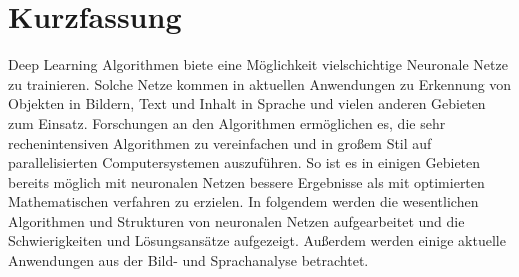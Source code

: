 \chapter{Kurzfassung}

Deep Learning Algorithmen biete eine Möglichkeit vielschichtige Neuronale Netze zu trainieren. Solche Netze kommen in aktuellen Anwendungen zu Erkennung von Objekten in Bildern, Text und Inhalt in Sprache und vielen anderen Gebieten zum Einsatz. Forschungen an den Algorithmen ermöglichen es, die sehr rechenintensiven Algorithmen zu vereinfachen und in großem Stil auf parallelisierten Computersystemen auszuführen. So ist es in einigen Gebieten bereits möglich mit neuronalen Netzen bessere Ergebnisse als mit optimierten Mathematischen verfahren zu erzielen. In folgendem werden die wesentlichen Algorithmen und Strukturen von neuronalen Netzen aufgearbeitet und die Schwierigkeiten und Lösungsansätze aufgezeigt. Außerdem werden einige aktuelle Anwendungen aus der Bild- und Sprachanalyse betrachtet.